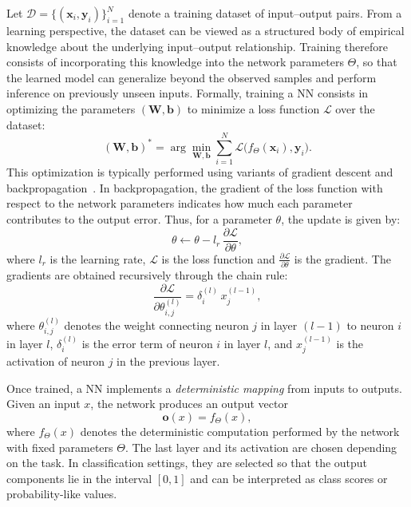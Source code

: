 Let $\mathcal{D} = \{(\mathbf{x}_i, \mathbf{y}_i)\}_{i=1}^{N}$ denote a training dataset of input–output pairs. From a learning perspective, the dataset can be viewed as a structured body of empirical knowledge about the underlying input--output relationship. Training therefore consists of incorporating this knowledge into the network parameters $\Theta$, so that the learned model can generalize beyond the observed samples and perform inference on previously unseen inputs.
Formally, training a \ac{NN} consists in optimizing the parameters $(\mathbf{W}, \mathbf{b})$ to minimize a loss function $\mathcal{L}$ over the dataset:
\[
(\mathbf{W}, \mathbf{b})^* = \arg\min_{\mathbf{W}, \mathbf{b}} \sum_{i=1}^{N} \mathcal{L}\big(f_\Theta(\mathbf{x}_i), \mathbf{y}_i\big).
\]
This optimization is typically performed using variants of gradient descent and backpropagation~\cite{rumelhart1986learning}. In backpropagation, the gradient of the loss function with respect to the network parameters indicates how much each parameter contributes to the output error. 
Thus, for a parameter $\theta$, the update is given by:
\begin{equation}
    \label{eq:gd1_rw}
    \theta \leftarrow \theta - l_r \, \frac{\partial \mathcal{L}}{\partial \theta},
\end{equation}
where $l_r$ is the learning rate, $\mathcal{L}$ is the loss function and $\frac{\partial \mathcal{L}}{\partial \theta}$ is the gradient.
The gradients are obtained recursively through the chain rule:
\begin{equation}
    \label{eq:gd2_rw}
    \frac{\partial \mathcal{L}}{\partial \theta^{(l)}_{i,j}} 
    = \delta^{(l)}_i \, x^{(l-1)}_j,
\end{equation}
where $\theta^{(l)}_{i,j}$ denotes the weight connecting neuron $j$ in layer $(l-1)$ to neuron $i$ in layer $l$, $\delta^{(l)}_i$ is the error term of neuron $i$ in layer $l$, and $x^{(l-1)}_j$ is the activation of neuron $j$ in the previous layer.


Once trained, a \ac{NN} implements a \emph{deterministic mapping} from inputs to outputs.
Given an input \( x \), the network produces an output vector
\[
\mathbf{o}(x) = f_\Theta(x),
\]
where \( f_\Theta(x) \) denotes the deterministic computation performed by the network with fixed parameters \( \Theta \). The last layer and its activation are chosen depending on the task. In classification settings, they are selected so that the output components lie in the interval \( [0,1] \) and can be interpreted as class scores or probability-like values.

